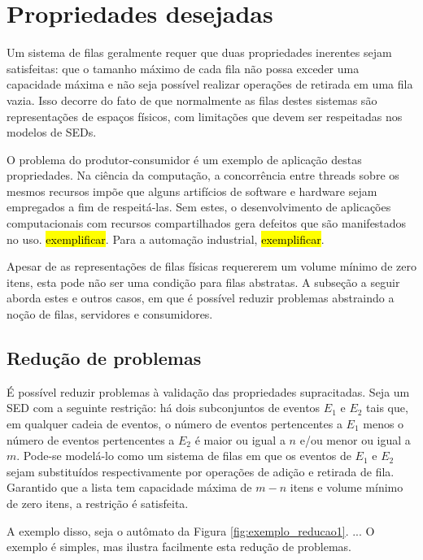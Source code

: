 \section{Propriedades desejadas}

Um sistema de filas geralmente requer que duas propriedades inerentes sejam satisfeitas: que o tamanho máximo de cada fila não possa exceder uma capacidade máxima e não seja possível realizar operações de retirada em uma fila vazia. Isso decorre do fato de que normalmente as filas destes sistemas são representações de espaços físicos, com limitações que devem ser respeitadas nos modelos de SEDs.

O problema do produtor-consumidor é um exemplo de aplicação destas propriedades. Na ciência da computação, a concorrência entre threads sobre os mesmos recursos impõe que alguns artifícios de software e hardware sejam empregados a fim de respeitá-las. Sem estes, o desenvolvimento de aplicações computacionais com recursos compartilhados gera defeitos que são manifestados no uso. \hl{exemplificar}. Para a automação industrial, \hl{exemplificar}.

Apesar de as representações de filas físicas requererem um volume mínimo de zero itens, esta pode não ser uma condição para filas abstratas. A subseção a seguir aborda estes e outros casos, em que é possível reduzir problemas abstraindo a noção de filas, servidores e consumidores.

\subsection{Redução de problemas}

É possível reduzir problemas à validação das propriedades supracitadas. Seja um SED com a seguinte restrição: há dois subconjuntos de eventos $E_1$ e $E_2$ tais que, em qualquer cadeia de eventos, o número de eventos pertencentes a $E_1$ menos o número de eventos pertencentes a $E_2$ é maior ou igual a $n$ e/ou menor ou igual a $m$. Pode-se modelá-lo como um sistema de filas em que os eventos de $E_1$ e $E_2$ sejam substituídos respectivamente por operações de adição e retirada de fila. Garantido que a lista tem capacidade máxima de $m - n$ itens e volume mínimo de zero itens, a restrição é satisfeita.

A exemplo disso, seja o autômato da Figura \ref{fig:exemplo_reducao1}. ... O exemplo é simples, mas ilustra facilmente esta redução de problemas.


